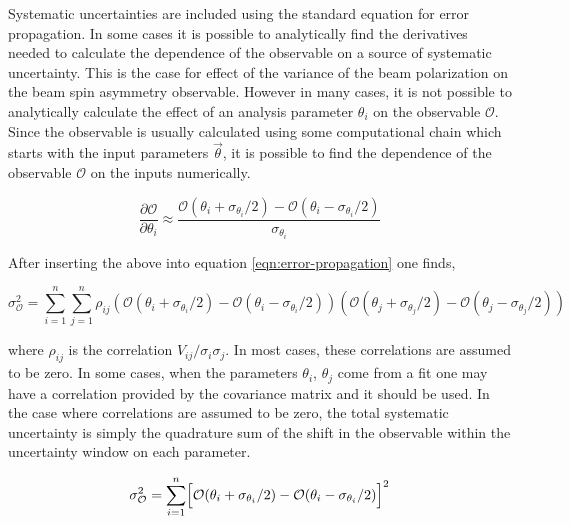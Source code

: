 
Systematic uncertainties are included using the standard equation for error propagation.  In some cases it is possible to analytically find the derivatives needed to calculate the dependence of the observable on a source of systematic uncertainty.  This is the case for effect of the variance of the beam polarization on the beam spin asymmetry observable.  However in many cases, it is not possible to analytically calculate the effect of an analysis parameter $\theta_i$ on the observable $\mathcal{O}$.  Since the observable is usually calculated using some computational chain which starts with the input parameters $\vec{\theta}$, it is possible to find the dependence of the observable $\mathcal{O}$ on the inputs numerically.

\begin{equation}
  \frac{\partial \mathcal{O}}{ \partial \theta_i} \approx \frac{\mathcal{O}(\theta_i + \sigma_{\theta_i}/2) - \mathcal{O}(\theta_i - \sigma_{\theta_i}/2)}{\sigma_{\theta_i}}
\end{equation}

After inserting the above into equation \ref{eqn:error-propagation} one finds,

\begin{equation}
  \sigma_{\mathcal{O}}^{2} = \sum_{i=1}^{n} \sum_{j=1}^{n} \rho_{ij} (\mathcal{O}(\theta_i + \sigma_{\theta_i}/2) - \mathcal{O}(\theta_i - \sigma_{\theta_i}/2)) (\mathcal{O}(\theta_j + \sigma_{\theta_j}/2) - \mathcal{O}(\theta_j - \sigma_{\theta_j}/2)) 
\end{equation}

where $\rho_{ij}$ is the correlation $V_{ij}/\sigma_i \sigma_j$.  In most cases, these correlations are assumed to be zero.  In some cases, when the parameters $\theta_i$, $\theta_j$ come from a fit one may have a correlation provided by the covariance matrix and it should be used.  In the case where correlations are assumed to be zero, the total systematic uncertainty is simply the quadrature sum of the shift in the observable within the uncertainty window on each parameter.

\begin{equation}
  \sigma_{\mathcal{O}}^{2} = \sum_{i=1}^{n} \Bigl[ \mathcal{O}(\theta_i + \sigma_{\theta_i}/2) - \mathcal{O}(\theta_i - \sigma_{\theta_i}/2) \Bigr]^2
\end{equation}

